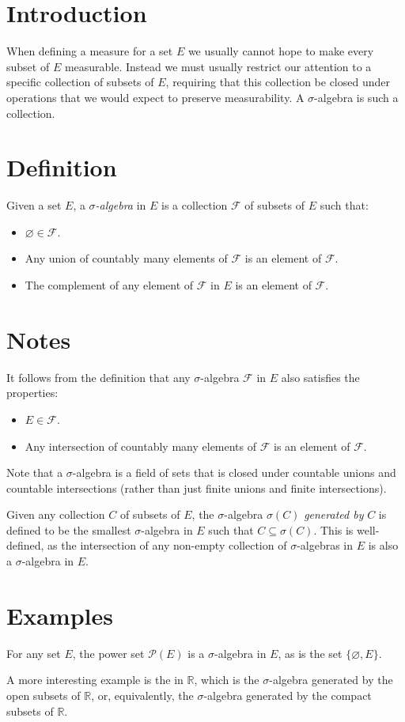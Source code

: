 \documentclass[12pt]{article}
\def\emptyset{\varnothing}
\def\F{\mathcal{F}}
\def\R{\mathbb{R}}
\def\powerset#1{\mathcal{P}(#1)}
\begin{document}

\section*{Introduction}

When defining a measure for a set $E$
we usually cannot hope to make every subset of $E$ measurable.
Instead we must usually restrict our attention
to a specific collection of subsets of $E$,
requiring that this collection be closed under operations
that we would expect to preserve measurability.
A $\sigma$-algebra is such a collection.

\section*{Definition}

Given a set $E$, a \emph{$\sigma$-algebra} in $E$
is a collection $\F$ of subsets of $E$ such that:
\begin{itemize}
\item $\emptyset\in\F$.
\item Any union of countably many elements of $\F$
      is an element of $\F$.
\item The complement of any element of $\F$ in $E$
      is an element of $\F$.
\end{itemize}

\section*{Notes}

It follows from the definition that any $\sigma$-algebra $\F$ in $E$
also satisfies the properties:
\begin{itemize}
\item $E\in\F$.
\item Any intersection of countably many elements of $\F$
      is an element of $\F$.
\end{itemize}

Note that a $\sigma$-algebra is a field of sets
that is closed under countable unions and countable intersections
(rather than just finite unions and finite intersections).

Given any collection $C$ of subsets of $E$,
the $\sigma$-algebra $\sigma(C)$ \emph{generated by} $C$
is defined to be the smallest $\sigma$-algebra in $E$
such that $C\subseteq \sigma(C)$.
This is well-defined,
as the intersection of any non-empty collection of $\sigma$-algebras in $E$
is also a $\sigma$-algebra in $E$.

\section*{Examples}

For any set $E$, 
the power set $\powerset{E}$ is a $\sigma$-algebra in $E$,
as is the set $\{\emptyset,E\}$.

A more interesting example is the 
 in $\R$,
which is the $\sigma$-algebra generated by the open subsets of $\R$,
or, equivalently,
the $\sigma$-algebra generated by the compact subsets of $\R$.
\end{document}

